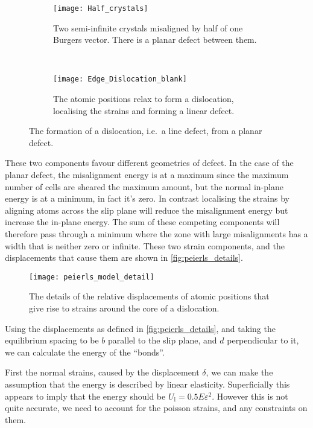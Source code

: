 \FloatBarrier
\begin{figure}[h!]
\centering
\begin{subfigure}{0.35\textwidth}
\centering
\texttt{[image: Half\_crystals]}
\caption{Two semi-infinite crystals misaligned by half of one Burgers vector. There is a planar defect between them.\label{fig:planar_defect}}
\end{subfigure}
~
\begin{subfigure}{0.35\textwidth}
\centering
\texttt{[image: Edge\_Dislocation\_blank]}
\caption{The atomic positions relax to form a dislocation, localising the strains and forming a linear defect.\label{fig:linear_defecct}}
\end{subfigure}
\caption{The formation of a dislocation, i.e.\ a line defect, from a planar defect.\label{fig:making_a_disloc}}
\end{figure}

\FloatBarrier
These two components favour different geometries of defect. In the case of the planar defect, the misalignment energy is at a maximum since the maximum number of cells are sheared the maximum amount, but the normal in-plane energy is at a minimum, in fact it's zero. In contrast localising the strains by aligning atoms across the slip plane will reduce the misalignment energy but increase the in-plane energy. The sum of these competing components will therefore pass through a minimum where the zone with large misalignments has a width that is neither zero or infinite. These two strain components, and the displacements that cause them are shown in \autoref{fig:peierls_details}.




\begin{figure}
\centering
\texttt{[image: peierls\_model\_detail]}
\caption{The details of the relative displacements of atomic positions that give rise to strains around the core of a dislocation.\label{fig:peierls_details}}
\end{figure}

Using the displacements as defined in \autoref{fig:peierls_details}, and taking the equilibrium spacing to be $b$ parallel to the slip plane, and $d$ perpendicular to it, we can calculate the energy of the ``bonds''.

First the normal strains, caused by the displacement $\delta$, we can make the assumption that the energy is described by linear elasticity. Superficially this appears to imply that the energy should be $U_\text{i}=0.5E\varepsilon^2$. However this is not quite accurate, we need to account for the poisson strains, and any constraints on them.

